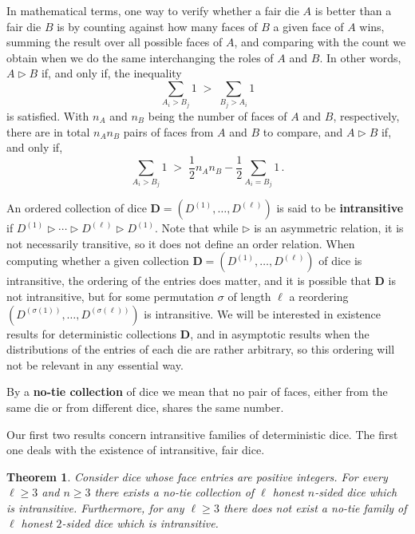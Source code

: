 \documentclass[reqno,a4paper,11pt]{amsart}
\newcommand{\btt}{\triangleright}
\newtheorem{theorem}[lemma]{Theorem}
\theoremstyle{remark}
\newcommand{\mb}[1]{{\mathbf #1}}
\numberwithin{equation}{section}
\begin{document}
In mathematical terms, one way to verify whether a fair die $A$ is better than a fair die $B$ is by counting against how many faces of $B$ a given face of $A$ wins, summing the result over all possible faces of $A$, and comparing with the count we obtain when we do the same interchanging the roles of $A$ and $B$. In other words, $A\btt B$ if, and only if, the inequality
%
$$
\sum_{A_i>B_j}1 \;>\;\sum_{B_j>A_i}1
$$
%
is satisfied. With $n_A$ and $n_B$ being the number of faces of $A$ and $B$, respectively, there are in total $n_An_B$ pairs of faces from $A$ and $B$ to compare, and $A\btt B$ if, and only if,
\begin{equation}\label{eq:fundcomparison}
\sum_{A_i>B_j}1 \;>\;
\frac{1}{2}n_An_B-\frac{1}{2}\sum_{A_i=B_j}1\,.
\end{equation}

An ordered collection of dice $\mb D=(D^{(1)},\dots,D^{(\ell)})$ is said to be \textbf{intransitive} if \(D^{(1)} \btt
\cdots \btt D^{(\ell)}\btt D^{(1)}\).  Note that while $\btt$ is an asymmetric relation,
it is not necessarily transitive, so it does not define an order relation. When
computing whether a given collection $\mb D=(D^{(1)},\hdots,D^{(\ell)})$ of
dice is intransitive, the ordering of the entries does matter, and it is possible that $\mb D$ is not
intransitive, but for some permutation $\sigma$ of length $\ell$ a reordering $(D^{(\sigma(1))},\hdots, D^{(\sigma(\ell ))})$ is intransitive. We will be interested in existence results for deterministic collections $\mb D$, and in asymptotic results when the distributions of the entries of each die are rather arbitrary, so this ordering will not be relevant in any essential way.



By a \textbf{no-tie collection} of dice we mean that no pair of faces, either from the same die or from different dice, shares the same number.

Our first two results concern intransitive families of deterministic dice. The first one deals with the existence of intransitive, fair dice.
        \begin{theorem}\label{different_faces}
        Consider dice whose face entries are positive integers.
                For every \(\ell \geq 3\) and \(n \geq 3\) there exists a no-tie collection of $\ell$ honest $n$-sided dice which is intransitive.
                Furthermore, for any $\ell\geq 3$ there does not exist a no-tie family of $\ell$ honest $2$-sided dice which is intransitive.
        \end{theorem}
\end{document}
